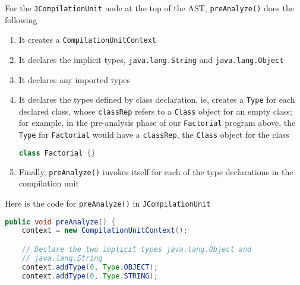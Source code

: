 \documentclass[8pt,a4paper,compress]{beamer}
\begin{document}
\begin{frame}[fragile]
\pause

For the \lstinline{JCompilationUnit} node at the top of the AST, \lstinline{preAnalyze()} does the following
\begin{enumerate}
\pause
\item It creates a \lstinline{CompilationUnitContext}
\pause
\item It declares the implicit \jmm types, \lstinline{java.lang.String} and \lstinline{java.lang.Object}
\pause
\item It declares any imported types
\pause
\item It declares the types defined by class declaration, ie, creates a \lstinline{Type} for each declared class, whose \lstinline{classRep} refers to a \lstinline{Class} object for an empty class; for example, in the pre-analysis phase of our \lstinline{Factorial} program above, the \lstinline{Type} for \lstinline{Factorial} would have a \lstinline{classRep}, the \lstinline{Class} object for the class
\begin{lstlisting}[language=Java,style=focusin]
class Factorial {}
\end{lstlisting}
\pause
\item Finally, \lstinline{preAnalyze()} invokes itself for each of the type declarations in the compilation unit
\end{enumerate}

\pause
\bigskip

Here is the code for \lstinline{preAnalyze()} in \lstinline{JCompilationUnit}
\begin{lstlisting}[language=Java,style=focusin]
public void preAnalyze() {
    context = new CompilationUnitContext();

    // Declare the two implicit types java.lang.Object and
    // java.lang.String
    context.addType(0, Type.OBJECT);
    context.addType(0, Type.STRING);
\end{lstlisting}
\end{frame}
\end{document}
